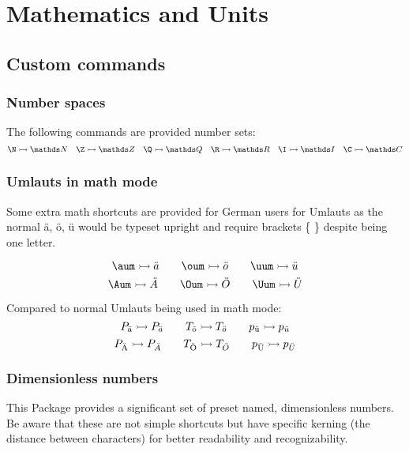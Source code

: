 \section{Mathematics and Units}


\begingroup \small
\subsection{Custom commands}

    \subsubsection{Number spaces}
        The following commands are provided number sets:
        \[
            \verb|\N| \rightarrowtail \N \quad
            \verb|\Z| \rightarrowtail\Z \quad
            \verb|\Q| \rightarrowtail\Q \quad
            \verb|\R| \rightarrowtail\R \quad
            \verb|\I| \rightarrowtail\I \quad
            \verb|\C| \rightarrowtail\C
        \]

    \subsubsection{Umlauts in math mode}
        Some extra math shortcuts are provided for German users for Umlauts as the normal ä, ö, ü would be typeset upright and require brackets \{ \} despite being one letter.

        \[
            \verb|\aum| \rightarrowtail  \aum \qquad
            \verb|\oum| \rightarrowtail  \oum \qquad
            \verb|\uum| \rightarrowtail  \uum
        \]
        \[
            \verb|\Aum| \rightarrowtail  \Aum \qquad
            \verb|\Oum| \rightarrowtail  \Oum \qquad
            \verb|\Uum| \rightarrowtail  \Uum
        \]

        Compared to normal Umlauts being used in math mode:
        \[
            P_{\ddot{\mathrm{a}}} \rightarrowtail P_{\ddot{a}} \qquad
            T_{\ddot{\mathrm{o}}} \rightarrowtail T_{\ddot{o}} \qquad
            p_{\ddot{\mathrm{u}}} \rightarrowtail p_{\ddot{u}}
        \]
        \[
            P_{\ddot{\mathrm{A}}} \rightarrowtail P_{\ddot{A}} \qquad
            T_{\ddot{\mathrm{O}}} \rightarrowtail T_{\ddot{O}} \qquad
            p_{\ddot{\mathrm{U}}} \rightarrowtail p_{\ddot{U}}
        \]


    \subsubsection{Dimensionless numbers}
        This Package provides a significant set of preset named, dimensionless numbers. Be aware that these are not simple shortcuts but have specific kerning (the distance between characters) for better readability and recognizability.

